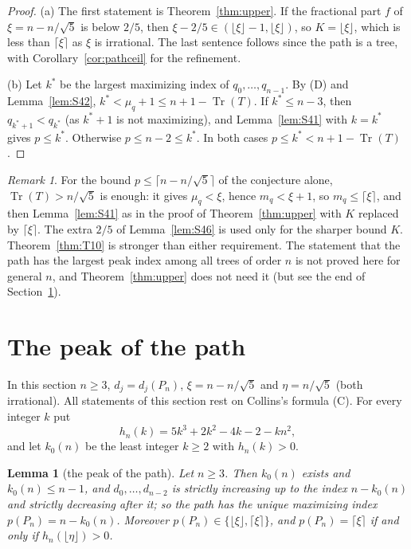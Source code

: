 \documentclass[11pt]{amsart}
\newtheorem{lemma}[theorem]{Lemma}
\theoremstyle{definition}
\theoremstyle{remark}
\newtheorem{remark}[theorem]{Remark}
\newcommand{\Tr}{\operatorname{Tr}}
\begin{document}
\begin{proof}
(a) The first statement is Theorem~\ref{thm:upper}. If the fractional part
$f$ of $\xi=n-n/\sqrt5$ is below $2/5$, then
$\xi-2/5\in(\lfloor \xi\rfloor-1,\lfloor \xi\rfloor)$, so $K=\lfloor \xi\rfloor$, which
is less than $\lceil \xi\rceil$ as $\xi$ is irrational. The last sentence follows
since the path is a tree, with Corollary~\ref{cor:pathceil} for the refinement.

(b) Let $k^*$ be the largest maximizing index of $q_0,\dots,q_{n-1}$. By (D)
and Lemma~\ref{lem:S42}, $k^*<\mu_q+1\le n+1-\Tr(T)$. If $k^*\le n-3$, then
$q_{k^*+1}<q_{k^*}$ (as $k^*+1$ is not maximizing), and Lemma~\ref{lem:S41}
with $k=k^*$ gives $p\le k^*$. Otherwise $p\le n-2\le k^*$. In both cases
$p\le k^*<n+1-\Tr(T)$.
\end{proof}

\begin{remark}
For the bound $p\le\lceil n-n/\sqrt5\rceil$ of the conjecture alone,
$\Tr(T)>n/\sqrt5$ is enough: it gives $\mu_q<\xi$, hence $m_q<\xi+1$, so
$m_q\le\lceil \xi\rceil$, and then Lemma~\ref{lem:S41} as in the proof of
Theorem~\ref{thm:upper} with $K$ replaced by $\lceil \xi\rceil$. The extra $2/5$
of Lemma~\ref{lem:S46} is used only for the sharper bound $K$.
Theorem~\ref{thm:T10} is stronger than either requirement. The statement
that the path has the largest peak index among all trees of order $n$ is
not proved here for general $n$, and Theorem~\ref{thm:upper} does not need it
(but see the end of Section~\ref{sec:path}).
\end{remark}

\section{The peak of the path}\label{sec:path}

In this section $n\ge3$, $d_j=d_j(P_n)$, $\xi=n-n/\sqrt5$ and $\eta=n/\sqrt5$
(both irrational). All statements of this section rest on Collins's formula
(C). For every integer $k$ put
\[
h_n(k)=5k^3+2k^2-4k-2-kn^2,
\]
and let $k_0(n)$ be the least integer $k\ge2$ with $h_n(k)>0$.

\begin{lemma}[the peak of the path]\label{lem:S47}
Let $n\ge3$. Then $k_0(n)$ exists and $k_0(n)\le n-1$, and
$d_0,\dots,d_{n-2}$ is strictly increasing up to the index $n-k_0(n)$ and
strictly decreasing after it; so the path has the unique maximizing index
$p(P_n)=n-k_0(n)$. Moreover $p(P_n)\in\{\lfloor \xi\rfloor,\lceil \xi\rceil\}$, and
$p(P_n)=\lceil \xi\rceil$ if and only if $h_n(\lfloor \eta\rfloor)>0$.
\end{lemma}
\end{document}
